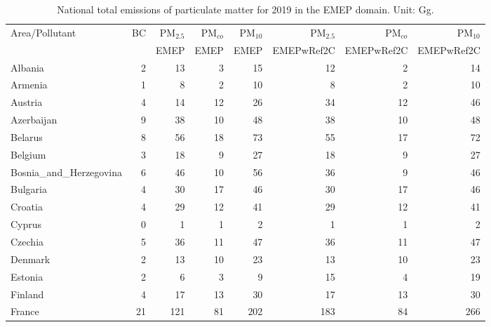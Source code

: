 \begin{table}
\caption{National total emissions of particulate matter for 2019 in the EMEP
  domain. Unit: Gg. }
\label{tab:2019emisPM}

\vspace{15pt}

\begin{center}
\scriptsize
\begin{tabular}{|l|r|r|r|r||r|r|r|}
\hline
 Area/Pollutant& BC&PM$_{2.5}$&PM$_{co}$&PM$_{10}$&PM$_{2.5}$&PM$_{co}$&PM$_{10}$\\
 &&EMEP&EMEP&EMEP&EMEPwRef2C&EMEPwRef2C&EMEPwRef2C\\\hline\hline
                       Albania&     2&    13&     3&    15&    12&     2&    14 \\\hline
                       Armenia&     1&     8&     2&    10&     8&     2&    10 \\\hline
                       Austria&     4&    14&    12&    26&    34&    12&    46 \\\hline
                    Azerbaijan&     9&    38&    10&    48&    38&    10&    48 \\\hline
                       Belarus&     8&    56&    18&    73&    55&    17&    72 \\\hline
                       Belgium&     3&    18&     9&    27&    18&     9&    27 \\\hline
        Bosnia_and_Herzegovina&     6&    46&    10&    56&    36&     9&    46 \\\hline
                      Bulgaria&     4&    30&    17&    46&    30&    17&    46 \\\hline
                       Croatia&     4&    29&    12&    41&    29&    12&    41 \\\hline
                        Cyprus&     0&     1&     1&     2&     1&     1&     2 \\\hline
                       Czechia&     5&    36&    11&    47&    36&    11&    47 \\\hline
                       Denmark&     2&    13&    10&    23&    13&    10&    23 \\\hline
                       Estonia&     2&     6&     3&     9&    15&     4&    19 \\\hline
                       Finland&     4&    17&    13&    30&    17&    13&    30 \\\hline
                        France&    21&   121&    81&   202&   183&    84&   266 \\\hline

\end{tabular}
\end{center}
\end{table}
